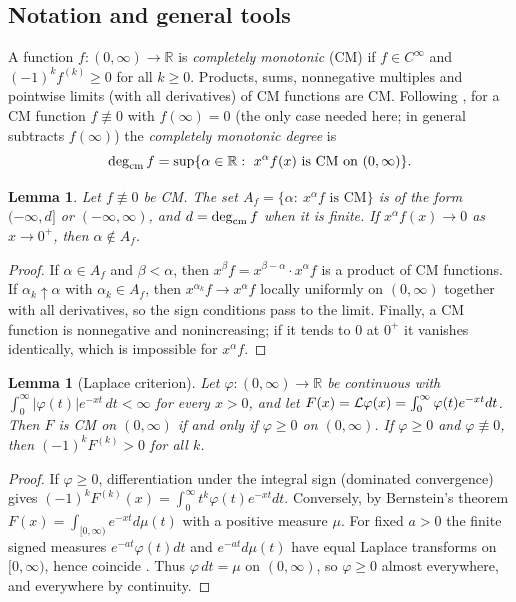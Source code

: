 \documentclass[11pt]{amsart}
\newtheorem{lemma}[theorem]{Lemma}
\theoremstyle{definition}
\theoremstyle{remark}
\begin{document}
\subsection{Notation and general tools}
\label{R2:subsec:tools}

A function $f\colon(0,\infty)\to\mathbb R$ is \emph{completely monotonic}
(CM) if $f\in C^\infty$ and $(-1)^kf^{(k)}\ge0$ for all $k\ge0$. Products,
sums, nonnegative multiples and pointwise limits (with all derivatives) of
CM functions are CM. Following \cite{R2-QiAgarwal2019}, for a CM function
$f\not\equiv0$ with $f(\infty)=0$ (the only case needed here; in general
\cite{R2-QiAgarwal2019} subtracts $f(\infty)$) the \emph{completely
monotonic degree} is
\[
 \operatorname{deg}_{\mathrm{cm}} f=\sup\{\alpha\in\mathbb R:\ x^\alpha f(x)\text{ is CM on }(0,\infty)\}.
\]

\begin{lemma}\label{R2:lem:degset}
Let $f\not\equiv0$ be CM. The set $A_f=\{\alpha:\ x^\alpha f\text{ is CM}\}$
is of the form $(-\infty,d]$ or $(-\infty,\infty)$, and $d=\operatorname{deg}_{\mathrm{cm}} f$ when
it is finite. If $x^{\alpha}f(x)\to0$ as $x\to0^+$, then $\alpha\notin A_f$.
\end{lemma}
\begin{proof}
If $\alpha\in A_f$ and $\beta<\alpha$, then $x^\beta f=x^{\beta-\alpha}\cdot
x^\alpha f$ is a product of CM functions. If $\alpha_k\uparrow\alpha$ with
$\alpha_k\in A_f$, then $x^{\alpha_k}f\to x^\alpha f$ locally uniformly on
$(0,\infty)$ together with all derivatives, so the sign conditions pass to
the limit. Finally, a CM function is nonnegative and nonincreasing; if it
tends to $0$ at $0^+$ it vanishes identically, which is impossible for
$x^\alpha f$.
\end{proof}

\begin{lemma}[Laplace criterion]\label{R2:lem:bern}
Let $\varphi\colon(0,\infty)\to\mathbb R$ be continuous with
$\int_0^\infty|\varphi(t)|e^{-xt}\,dt<\infty$ for every $x>0$, and let
$F(x)=\mathcal{L}\varphi(x)=\int_0^\infty\varphi(t)e^{-xt}dt$. Then $F$ is CM
on $(0,\infty)$ if and only if $\varphi\ge0$ on $(0,\infty)$. If
$\varphi\ge0$ and $\varphi\not\equiv0$, then $(-1)^kF^{(k)}>0$ for all $k$.
\end{lemma}
\begin{proof}
If $\varphi\ge0$, differentiation under the integral sign (dominated
convergence) gives $(-1)^kF^{(k)}(x)=\int_0^\infty t^k\varphi(t)e^{-xt}dt$.
Conversely, by Bernstein's theorem $F(x)=\int_{[0,\infty)}e^{-xt}d\mu(t)$
with a positive measure $\mu$. For fixed $a>0$ the finite signed measures
$e^{-at}\varphi(t)dt$ and $e^{-at}d\mu(t)$ have equal Laplace transforms on
$[0,\infty)$, hence coincide \cite[Ch.~II, \S6]{R2-Widder}. Thus
$\varphi\,dt=\mu$ on $(0,\infty)$, so $\varphi\ge0$ almost everywhere, and
everywhere by continuity.
\end{proof}
\end{document}
